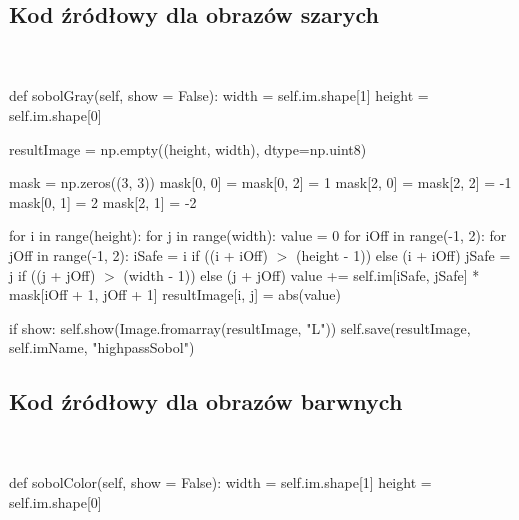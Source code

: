 \documentclass[final,a4paper,openany,12pt]{mwbk}
\begin{document}
\subsection*{Kod źródłowy dla obrazów szarych}
\hfill
\\\\
\noindent def sobolGray(self, show = False): \newline
\indent width = self.im.shape[1] \newline
\indent height = self.im.shape[0] \newline

resultImage = np.empty((height, width), dtype=np.uint8) \newline

mask = np.zeros((3, 3)) \newline
\indent mask[0, 0] = mask[0, 2] = 1 \newline
\indent mask[2, 0] = mask[2, 2] = -1 \newline
\indent mask[0, 1] = 2 \newline
\indent mask[2, 1] = -2 \newline

for i in range(height): \newline
\indent for j in range(width): \newline
\indent value = 0 \newline
\indent for iOff in range(-1, 2): \newline
\indent for jOff in range(-1, 2): \newline
\indent iSafe = i if ((i + iOff) $>$ (height - 1)) else (i + iOff) \newline
\indent jSafe = j if ((j + jOff) $>$ (width - 1)) else (j + jOff) \newline
\indent value += self.im[iSafe, jSafe] * mask[iOff + 1, jOff + 1] \newline
\indent resultImage[i, j] = abs(value) \newline

if show: \newline
\indent self.show(Image.fromarray(resultImage, "L")) \newline
\indent self.save(resultImage, self.imName, "highpassSobol") \newline
\newpage

\subsection*{Kod źródłowy dla obrazów barwnych}
\hfill
\\\\
\noindent def sobolColor(self, show = False): \newline
\indent width = self.im.shape[1] \newline
\indent height = self.im.shape[0] \newline
\end{document}
